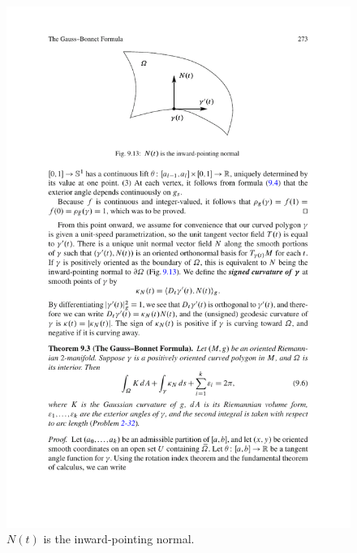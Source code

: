 \begin{figure}[htbp]
\centering
\includegraphics{pictures/inward-normal.pdf}
\caption{$N(t)$ is the inward-pointing normal.}
\end{figure}

